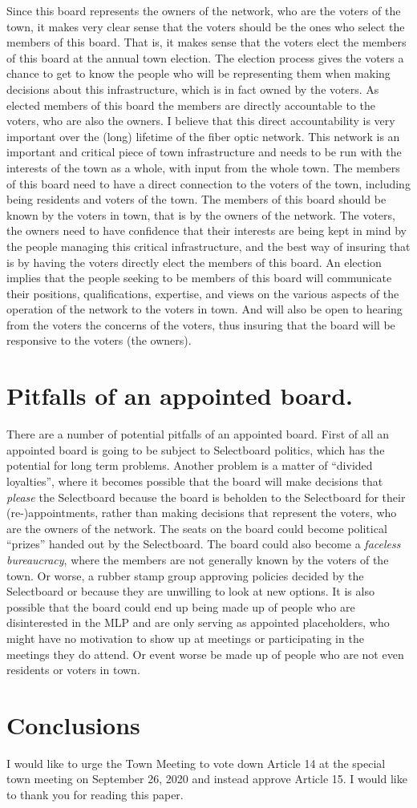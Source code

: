 \documentclass[12pt]{article}
\begin{document}
Since this board represents the owners of the network, who are the voters of
the town, it makes very clear sense that the voters should be the ones who
select the members of this board. That is, it makes sense that the voters
elect the members of this board at the annual town election. The election
process gives the voters a chance to get to know the people who will be
representing them when making decisions about this infrastructure, which is in
fact owned by the voters. As elected members of this board the members are
directly accountable to the voters, who are also the owners. I believe that
this direct accountability is very important over the (long) lifetime of the
fiber optic network. This network is an important and critical piece of town
infrastructure and needs to be run with the interests of the town as a whole,
with input from the whole town. The members of this board need to have a
direct connection to the voters of the town, including being residents and
voters of the town. The members of this board should be known by the voters in
town, that is by the owners of the network. The voters, the owners need to
have confidence that their interests are being kept in mind by the people
managing this critical infrastructure, and the best way of insuring that is by
having the voters directly elect the members of this board. An election
implies that the people seeking to be members of this board will communicate
their positions, qualifications, expertise, and views on the various aspects
of the operation of the network to the voters in town. And will also be open
to hearing from the voters the concerns of the voters, thus insuring that the
board will be responsive to the voters (the owners). 

\section{Pitfalls of an appointed board.}

There are a number of potential pitfalls of an appointed board. First of all
an appointed board is going to be subject to Selectboard politics, which has
the potential for long term problems. Another problem is a matter of ``divided
loyalties'', where it becomes possible that the board will make decisions that
\textit{please} the Selectboard because the board is beholden to the
Selectboard for their (re-)appointments, rather than making decisions that
represent the voters, who are the owners of the network. The seats on the
board could become political ``prizes'' handed out by the Selectboard. The
board could also become a \textit{faceless bureaucracy}, where the members are
not generally known by the voters of the town. Or worse, a rubber stamp group
approving policies decided by the Selectboard or because they are unwilling to
look at new options. It is also possible that the board could end up being
made up of people who are disinterested in the MLP and are only serving as
appointed placeholders, who might have no motivation to show up at meetings or
participating in the meetings they do attend. Or event worse be made up of
people who are not even residents or voters in town.

\section{Conclusions}

I would like to urge the Town Meeting to vote down Article 14 at the special
town meeting on September 26, 2020 and instead approve Article 15. I would
like to thank you for reading this paper.
\end{document}
